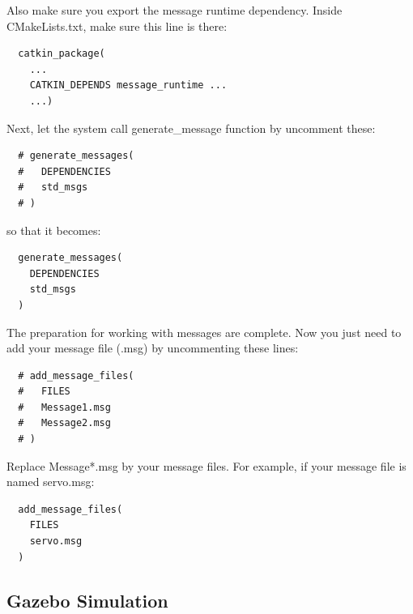 \documentclass[pdftex,12pt,a4paper]{article}
\begin{document}
  \newpage
  Also make sure you export the message runtime dependency. Inside CMakeLists.txt, make sure this line is there:
  \begin{lstlisting}
  catkin_package(
    ...
    CATKIN_DEPENDS message_runtime ...
    ...)
  \end{lstlisting}
  Next, let the system call generate\_message function by uncomment these:
  \begin{lstlisting}
  # generate_messages(
  #   DEPENDENCIES
  #   std_msgs
  # )
  \end{lstlisting}
  so that it becomes:
  \begin{lstlisting}
  generate_messages(
    DEPENDENCIES
    std_msgs
  )
  \end{lstlisting}
  The preparation for working with messages are complete. Now you just need to add your message file (.msg) by uncommenting these lines: 
  \begin{lstlisting}
  # add_message_files(
  #   FILES
  #   Message1.msg
  #   Message2.msg
  # )
  \end{lstlisting}
  Replace Message*.msg by your message files. For example, if your message file is named servo.msg:
  \begin{lstlisting}
  add_message_files(
    FILES
    servo.msg
  )
  \end{lstlisting}
  
  \newpage
  \subsection{Gazebo Simulation}
\end{document}
